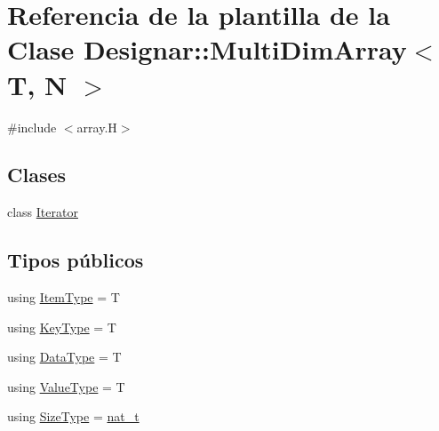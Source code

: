 \hypertarget{class_designar_1_1_multi_dim_array}{}\section{Referencia de la plantilla de la Clase Designar\+:\+:Multi\+Dim\+Array$<$ T, N $>$}
\label{class_designar_1_1_multi_dim_array}


{\ttfamily \#include $<$array.\+H$>$}

\subsection*{Clases}
\begin{DoxyCompactItemize}
\item 
class \hyperlink{class_designar_1_1_multi_dim_array_1_1_iterator}{Iterator}
\end{DoxyCompactItemize}
\subsection*{Tipos públicos}
\begin{DoxyCompactItemize}
\item 
using \hyperlink{class_designar_1_1_multi_dim_array_a1b4c346c7e11cbada54447843d0c7880}{Item\+Type} = T
\item 
using \hyperlink{class_designar_1_1_multi_dim_array_aa8c6b455e3cd5b74a57243a13553c6ff}{Key\+Type} = T
\item 
using \hyperlink{class_designar_1_1_multi_dim_array_a23b3bec3a6a803d8ef7becceb592d6c0}{Data\+Type} = T
\item 
using \hyperlink{class_designar_1_1_multi_dim_array_aecea28d754897523cdfa68bc28b829d3}{Value\+Type} = T
\item 
using \hyperlink{class_designar_1_1_multi_dim_array_a45c10514739f65d38ae3749569739267}{Size\+Type} = \hyperlink{namespace_designar_aa72662848b9f4815e7bf31a7cf3e33d1}{nat\+\_\+t}
\end{DoxyCompactItemize}
